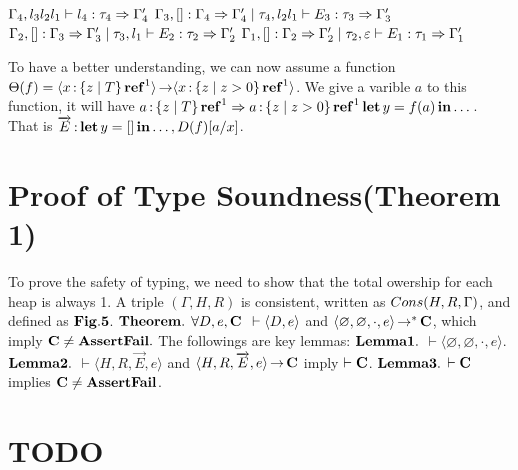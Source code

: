 \documentclass[runningheads]{llncs}
\begin{document}
$\\\Gamma_4, l_3 l_2 l_1 \vdash l_4:\tau_4 \Rightarrow \Gamma_4'\\$
$\Gamma_3, []:\Gamma_4 \Rightarrow \Gamma_4'\mid \tau_4, l_2 l_1 \vdash E_3:\tau_3 \Rightarrow \Gamma_3'\\$
$\Gamma_2, []:\Gamma_3 \Rightarrow \Gamma_3'\mid\tau_3, l_1 \vdash E_2:\tau_2 \Rightarrow \Gamma_2'\\$
$\Gamma_1, []:\Gamma_2 \Rightarrow \Gamma_2'\mid\tau_2, \varepsilon \vdash E_1:\tau_1 \Rightarrow \Gamma_1'\\$

To have a better understanding, we can now assume a function $\Theta(f) = \langle x\operatorname{:}\left\{{z\mid T}\right\}\operatorname{\mathbf{ref}}^1\rangle \operatorname{\rightarrow} \langle x\operatorname{:}\left\{{z\mid z>0}\right\}\operatorname{\mathbf{ref}}^1\rangle$.
We give a varible $a$ to this function, it will have $a\operatorname{:}\left\{{z\mid T}\right\}\operatorname{\mathbf{ref}}^1 \Rightarrow a\operatorname{:}\left\{{z\mid z>0}\right\}\operatorname{\mathbf{ref}}^1 \operatorname{\mathbf{let}} y=f(a) \operatorname{\mathbf{in}}\dots$.
That is $\overrightarrow{E}\operatorname{:} \operatorname{\mathbf{let}} y=[ ] \operatorname{\mathbf{in}}\dots, D(f)[a/x]$.


\section{Proof of Type Soundness(Theorem 1)}
To prove the safety of typing, we need to show that the total owership for each heap is always 1.
A triple $(\Gamma, H, R)$ is consistent, written as $Cons(H,R,\Gamma)$, and defined as $\bf{Fig.5}$.
$\\\bf{Theorem.}$
$\forall D, e, \bf{C}$ $\\ \vdash \langle D, e\rangle$ and $\langle \varnothing, \varnothing, \cdot, e \rangle \operatorname{\rightarrow}^* \bf{C}$, which imply
$\bf{C} \neq \bf{AssertFail}.\\$
The followings are key lemmas:
$\\\bf{Lemma 1.}$
$\vdash\langle \varnothing, \varnothing, \cdot, e \rangle$.
$\\\bf{Lemma 2.}$
$\vdash\langle H, R, \overrightarrow{E}, e \rangle$ and $\langle H, R, \overrightarrow{E}, e \rangle \operatorname{\rightarrow} \bf{C}$ imply $\vdash\bf{C}$.
$\\\bf{Lemma 3.}$
$\vdash\bf{C}$ implies $\bf{C} \neq \bf{AssertFail}$.

\section{TODO}
\end{document}
